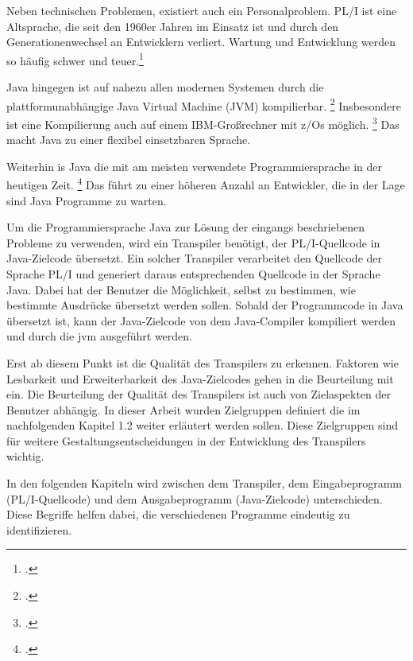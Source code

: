 Neben technischen Problemen, existiert auch ein Personalproblem. PL/I ist eine Altsprache, die seit den 1960er Jahren im Einsatz ist und durch den Generationenwechsel an Entwicklern verliert. Wartung und Entwicklung werden so häufig schwer und teuer.\footcite[Vgl. ][S. 227ff.]{histopli} 

Java hingegen ist auf nahezu allen modernen Systemen durch die plattformunabhängige Java Virtual Machine (JVM) kompilierbar. \footcite[Vgl. ][]{jvm}
Insbesondere ist eine Kompilierung auch auf einem IBM-Großrechner mit z/Os möglich. \footcite[Vgl. ][]{zos} 
Das macht Java zu einer flexibel einsetzbaren Sprache. 

Weiterhin is Java die mit am meisten verwendete Programmiersprache in der heutigen Zeit. \footcite[Vgl. ][]{tiobe} Das führt zu einer höheren Anzahl an Entwickler, die in der Lage sind Java Programme zu warten.

Um die Programmiersprache Java zur Lösung der eingangs beschriebenen Probleme zu verwenden, wird ein Transpiler benötigt, der PL/I-Quellcode in Java-Zielcode übersetzt. Ein solcher Transpiler verarbeitet den Quellcode der Sprache PL/I und generiert daraus entsprechenden Quellcode in der Sprache Java. Dabei hat der Benutzer die Möglichkeit, selbst zu bestimmen, wie bestimmte Ausdrücke übersetzt werden sollen. Sobald der Programmcode in Java übersetzt ist, kann der Java-Zielcode von dem Java-Compiler kompiliert werden und durch die \ac{jvm} ausgeführt werden.

Erst ab diesem Punkt ist die Qualität des Transpilers zu erkennen. Faktoren wie Lesbarkeit und Erweiterbarkeit des Java-Zielcodes gehen in die Beurteilung mit ein. 
Die Beurteilung der Qualität des Transpilers ist auch von Zielaspekten der Benutzer abhängig. In dieser Arbeit wurden Zielgruppen definiert die im nachfolgenden Kapitel 1.2 weiter erläutert werden sollen. Diese Zielgruppen sind für weitere Gestaltungsentscheidungen in der Entwicklung des Transpilers wichtig.

In den folgenden Kapiteln wird zwischen dem Transpiler, dem Eingabeprogramm (PL/I-Quellcode) und dem Ausgabeprogramm (Java-Zielcode) unterschieden. Diese Begriffe helfen dabei, die verschiedenen Programme eindeutig zu identifizieren.


